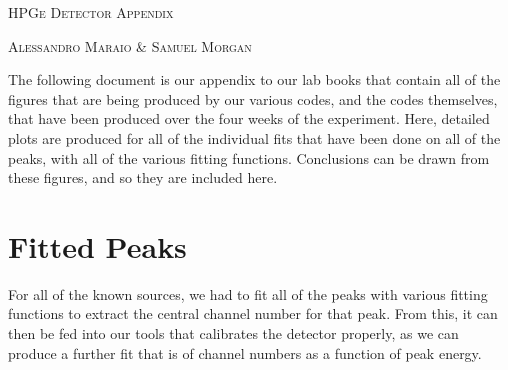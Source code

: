 \documentclass[11pt,a4paper]{article}
\begin{document}
\begin{titlepage}
\begin{center}

	{\scshape\Huge HPGe Detector Appendix \par} %
	\vspace{0.075cm}
  {\scshape\huge Alessandro Maraio \& Samuel Morgan \par}
  \hrulefill
\end{center}
\vspace*{-0.45cm}
The following document is our appendix to our lab books that contain all of the figures that are being produced by our various codes, and the codes themselves, that have been produced over the four weeks of the experiment. Here, detailed plots are produced for all of the individual fits that have been done on all of the peaks, with all of the various fitting functions. Conclusions can be drawn from these figures, and so they are included here.

\vspace*{-0.2cm}
\hrulefill
\vspace*{-0.2cm}
\clearpage
\end{titlepage}

\section{Fitted Peaks}

For all of the known sources, we had to fit all of the peaks with various fitting functions to extract the central channel number for that peak. From this, it can then be fed into our tools that calibrates the detector properly, as we can produce a further fit that is of channel numbers as a function of peak energy. 
\end{document}
